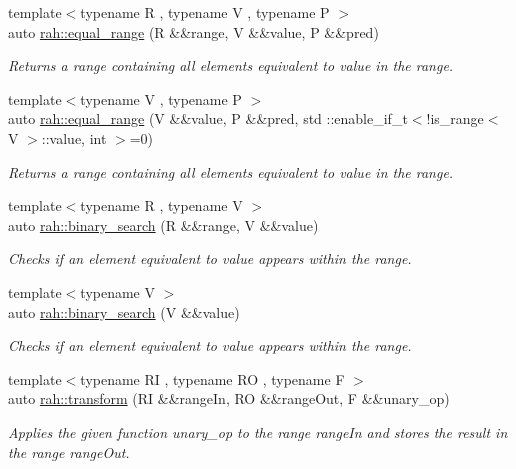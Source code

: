 \begin{DoxyCompactItemize}
{\footnotesize template$<$typename R , typename V , typename P $>$ }\\auto \mbox{\hyperlink{namespacerah_a8e598fa8efba31247802621369eb7c55}{rah\+::equal\+\_\+range}} (R \&\&range, V \&\&value, P \&\&pred)
\begin{DoxyCompactList}\small\item\em Returns a range containing all elements equivalent to value in the range. \end{DoxyCompactList}\item 
{\footnotesize template$<$typename V , typename P $>$ }\\auto \mbox{\hyperlink{namespacerah_a4669ef1ede981eaa73e76449c0fa138b}{rah\+::equal\+\_\+range}} (V \&\&value, P \&\&pred, std \+::enable\+\_\+if\+\_\+t$<$!is\+\_\+range$<$ V $>$\+::value, int $>$=0)
\begin{DoxyCompactList}\small\item\em Returns a range containing all elements equivalent to value in the range. \end{DoxyCompactList}\item 
{\footnotesize template$<$typename R , typename V $>$ }\\auto \mbox{\hyperlink{namespacerah_a5eef379d9f3039fd12f43d5220434976}{rah\+::binary\+\_\+search}} (R \&\&range, V \&\&value)
\begin{DoxyCompactList}\small\item\em Checks if an element equivalent to value appears within the range. \end{DoxyCompactList}\item 
{\footnotesize template$<$typename V $>$ }\\auto \mbox{\hyperlink{namespacerah_a8ac532c28d2c52c80adf91a7b8829bd6}{rah\+::binary\+\_\+search}} (V \&\&value)
\begin{DoxyCompactList}\small\item\em Checks if an element equivalent to value appears within the range. \end{DoxyCompactList}\item 
{\footnotesize template$<$typename RI , typename RO , typename F $>$ }\\auto \mbox{\hyperlink{namespacerah_a7cb27bf7219a7ee4b47cc9da217810a8}{rah\+::transform}} (RI \&\&range\+In, RO \&\&range\+Out, F \&\&unary\+\_\+op)
\begin{DoxyCompactList}\small\item\em Applies the given function unary\+\_\+op to the range range\+In and stores the result in the range range\+Out. \end{DoxyCompactList}\item 

\end{DoxyCompactItemize}
